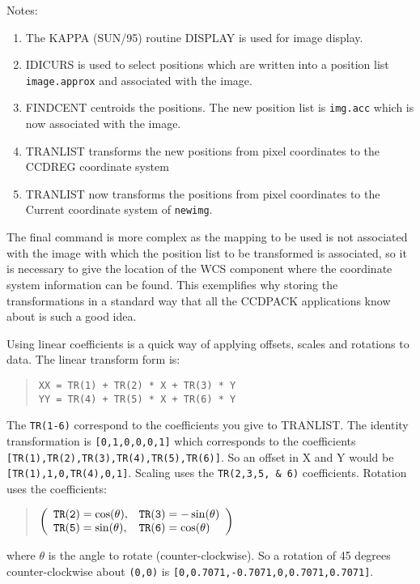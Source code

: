 \documentclass[twoside,11pt]{article}
\newcommand{\htmlref}[2]{#1}
\newcommand{\xref}[3]{#1}
\renewcommand{\_}{\texttt{\symbol{95}}}
\newenvironment{myquote}{\begin{quote}\begin{small}}{\end{small}\end{quote}}
\newcommand{\text}[1]{{\small \tt #1}}
\newcommand{\routine}[1]{{\sc #1}}
\newcommand{\xroutine}[1]{\htmlref{{\sc #1}}{#1}}
\begin{document}
Notes:
\begin{enumerate}
\item The \xref{KAPPA (SUN/95)}{sun95}{} routine \xref{DISPLAY}{sun95}{DISPLAY}
is used for image display.
\item \xroutine{IDICURS} is used to select positions which are written into a
position list \text{image.approx} and associated with the image.
\item \xroutine{FINDCENT} centroids the positions. The new position list is
\text{img.acc} which is now associated with the image.
\item \xroutine{TRANLIST} transforms the new positions from pixel coordinates
to the CCD\_REG coordinate system
\item \xroutine{TRANLIST} now transforms the positions from pixel 
coordinates to the Current coordinate system of \text{newimg}.
\end{enumerate}
The final command is more complex as the mapping to be used is not
associated with the image with which the position list to be transformed
is associated, so it is necessary to give the location of the WCS
component where the coordinate system information can be found.  
This exemplifies why storing the transformations in 
a standard way that all the CCDPACK applications know about is 
such a good idea.

Using linear coefficients is a quick way of applying offsets, scales and
rotations to data. The linear transform form is:
\begin{myquote}
\begin{verbatim}
XX = TR(1) + TR(2) * X + TR(3) * Y
YY = TR(4) + TR(5) * X + TR(6) * Y
\end{verbatim}
\end{myquote}
The \text{TR(1-6)} correspond to the coefficients you give to
\routine{TRANLIST}.
The identity transformation is \text{[0,1,0,0,0,1]} which corresponds
to the coefficients \text{[TR(1),TR(2),TR(3),TR(4),TR(5),TR(6)]}.
So an offset in X and Y would be \text{[TR(1),1,0,TR(4),0,1]}.
Scaling uses the \text{TR(2,3,5, \& 6)} coefficients.
Rotation uses the coefficients:
\begin{myquote}
\(
\left(
     \begin{array}{ll}
        \text{TR(2)} = \cos(\theta), & \text{TR(3)} = -\sin(\theta) \\
        \text{TR(5)} = \sin(\theta), & \text{TR(6)} = \cos(\theta) \\
     \end{array}
\right)
\)
\end{myquote}
where $\theta$ is the angle to rotate (counter-clockwise). So a rotation
of 45 degrees counter-clockwise about \text{(0,0)} is
\text{[0,0.7071,-0.7071,0,0.7071,0.7071]}.
\end{document}
